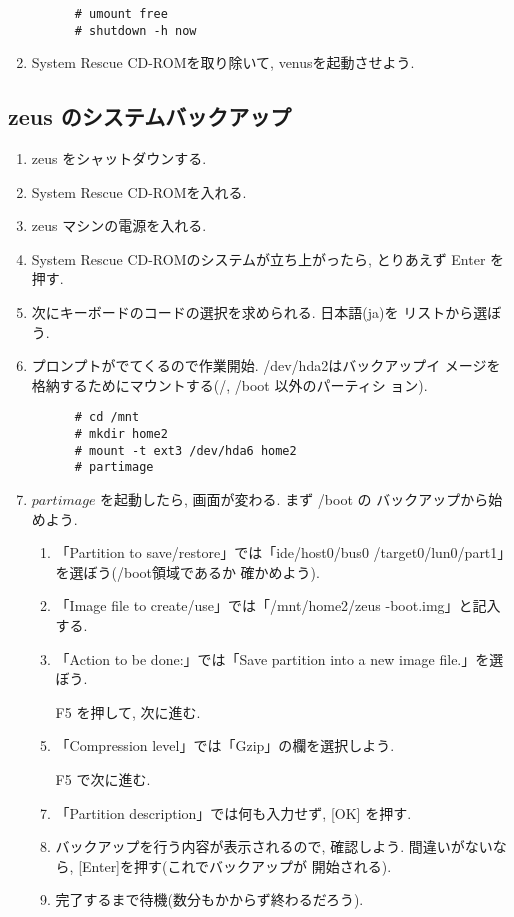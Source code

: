 \documentclass{jarticle}
\begin{document}
\begin{enumerate}
      \begin{verbatim}
      # umount free
      # shutdown -h now
      \end{verbatim}

\item System Rescue CD-ROMを取り除いて, venusを起動させよう.
\end{enumerate}

\subsection{zeus のシステムバックアップ}

\begin{enumerate}
\item zeus をシャットダウンする.
\item System Rescue CD-ROMを入れる.
\item zeus マシンの電源を入れる.
\item System Rescue CD-ROMのシステムが立ち上がったら, とりあえず
      Enter を押す.
\item 次にキーボードのコードの選択を求められる. 日本語(ja)を
      リストから選ぼう.
\item プロンプトがでてくるので作業開始. /dev/hda2はバックアップイ
      メージを格納するためにマウントする(/, /boot 以外のパーティシ
      ョン).

      \begin{verbatim}
      # cd /mnt
      # mkdir home2
      # mount -t ext3 /dev/hda6 home2
      # partimage
      \end{verbatim}

\item $partimage$ を起動したら, 画面が変わる. まず /boot の
      バックアップから始めよう.

      \begin{enumerate}
      \item 「Partition to save/restore」では「ide/host0/bus0
             /target0/lun0/part1」を選ぼう(/boot領域であるか
             確かめよう).
      \item 「Image file to create/use」では「/mnt/home2/zeus
             -boot.img」と記入する.
      \item 「Action to be done:」では「Save partition into a
             new image file.」を選ぼう.
      \item [F5]を押して, 次に進む.
      \item 「Compression level」では「Gzip」の欄を選択しよう.
      \item [F5]で次に進む.
      \item 「Partition description」では何も入力せず, [OK]
            を押す.
      \item バックアップを行う内容が表示されるので, 確認しよう.
            間違いがないなら, [Enter]を押す(これでバックアップが
            開始される).
      \item 完了するまで待機(数分もかからず終わるだろう).
      \end{enumerate}


\end{enumerate}
\end{document}

